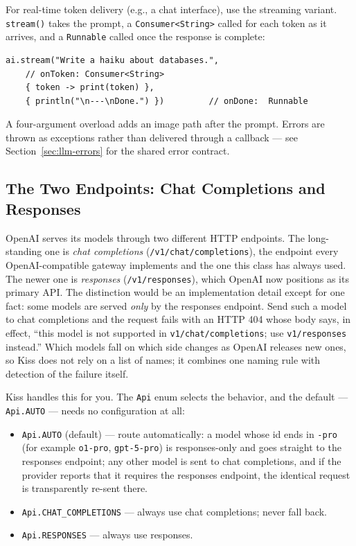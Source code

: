 For real-time token delivery (e.g., a chat interface), use the streaming variant.  \texttt{stream()} takes the prompt, a \texttt{Consumer<String>} called for each token as it arrives, and a \texttt{Runnable} called once the response is complete:

\begin{lstlisting}[style=groovy]
ai.stream("Write a haiku about databases.",
    // onToken: Consumer<String>
    { token -> print(token) },
    { println("\n---\nDone.") })         // onDone:  Runnable
\end{lstlisting}

\noindent
A four-argument overload adds an image path after the prompt.  Errors are thrown as exceptions rather than delivered through a callback --- see Section~\ref{sec:llm-errors} for the shared error contract.

\subsection{The Two Endpoints: Chat Completions and Responses}
\label{sec:llm-openai-api}

OpenAI serves its models through two different HTTP endpoints.  The long-standing one is \emph{chat completions} (\texttt{/v1/chat/completions}), the endpoint every OpenAI-compatible gateway implements and the one this class has always used.  The newer one is \emph{responses} (\texttt{/v1/responses}), which OpenAI now positions as its primary API.  The distinction would be an implementation detail except for one fact: some models are served \emph{only} by the responses endpoint.  Send such a model to chat completions and the request fails with an HTTP 404 whose body says, in effect, ``this model is not supported in \texttt{v1/chat/completions}; use \texttt{v1/responses} instead.''  Which models fall on which side changes as OpenAI releases new ones, so Kiss does not rely on a list of names; it combines one naming rule with detection of the failure itself.

Kiss handles this for you.  The \texttt{Api} enum selects the behavior, and the default --- \texttt{Api.AUTO} --- needs no configuration at all:

\begin{itemize}
  \item \texttt{Api.AUTO} (default) --- route automatically: a model whose id ends in \texttt{-pro} (for example \texttt{o1-pro}, \texttt{gpt-5-pro}) is responses-only and goes straight to the responses endpoint; any other model is sent to chat completions, and if the provider reports that it requires the responses endpoint, the identical request is transparently re-sent there.
  \item \texttt{Api.CHAT\_COMPLETIONS} --- always use chat completions; never fall back.
  \item \texttt{Api.RESPONSES} --- always use responses.
\end{itemize}

